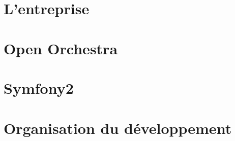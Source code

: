 \documentclass[a4paper]{report}
\begin{document}
\newcommand{\HRule}{\rule{\linewidth}{0.5mm}}



~
\thispagestyle{empty}

% 


\tableofcontents
\thispagestyle{empty}
\setcounter{page}{0}

\renewcommand{\arraystretch}{1.5}


~
\thispagestyle{empty}
\setcounter{page}{0}
\newpage

\part{L'entreprise}

\part{Open Orchestra}

\part{Symfony2}

\part{Organisation du développement}


\newpage

\nocite{*}



\end{document}
